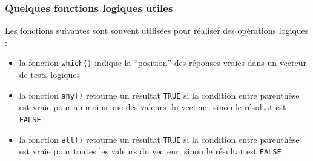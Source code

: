 \documentclass[
]{book}
\providecommand{\tightlist}{%
  \setlength{\itemsep}{0pt}\setlength{\parskip}{0pt}}
\begin{document}
\subsubsection{Quelques fonctions logiques utiles}\label{quelques-fonctions-logiques-utiles}

Les fonctions suivantes sont souvent utilisées pour réaliser des opérations logiques :

\begin{itemize}
\tightlist
\item
  la fonction \texttt{which()} indique la ``position'' des réponses vraies dans un vecteur de tests logiques
\item
  la fonction \texttt{any()} retourne un résultat \texttt{TRUE} si la condition entre parenthèse est vraie pour au moins une des valeurs du vecteur, sinon le résultat est \texttt{FALSE}
\item
  la fonction \texttt{all()} retourne un résultat \texttt{TRUE} si la condition entre parenthèse est vraie pour toutes les valeurs du vecteur, sinon le résultat est \texttt{FALSE}
\end{itemize}
\end{document}
